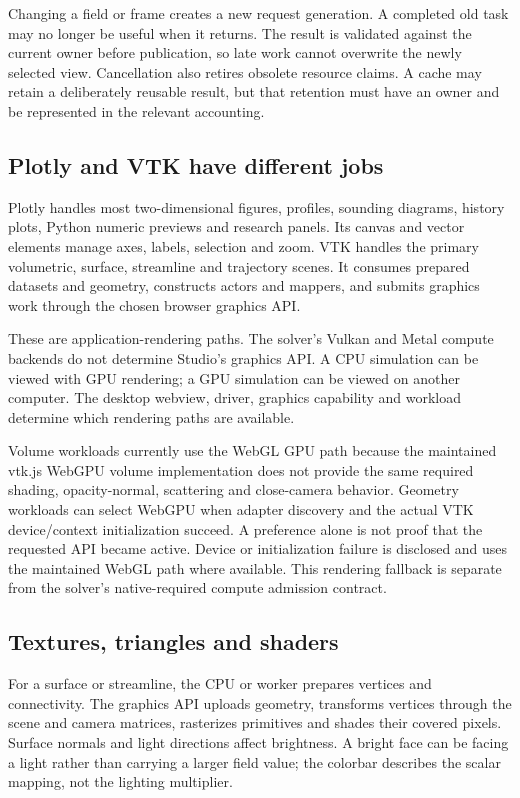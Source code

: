 Changing a field or frame creates a new request generation. A completed old task
may no longer be useful when it returns. The result is validated against the
current owner before publication, so late work cannot overwrite the newly
selected view. Cancellation also retires obsolete resource claims. A cache may
retain a deliberately reusable result, but that retention must have an owner and
be represented in the relevant accounting.

\subsection{Plotly and VTK have different jobs}
Plotly handles most two-dimensional figures, profiles, sounding diagrams,
history plots, Python numeric previews and research panels. Its canvas and vector
elements manage axes, labels, selection and zoom. VTK handles the primary
volumetric, surface, streamline and trajectory scenes. It consumes prepared
datasets and geometry, constructs actors and mappers, and submits graphics work
through the chosen browser graphics API.

These are application-rendering paths. The solver's Vulkan and Metal compute
backends do not determine Studio's graphics API. A CPU simulation can be viewed
with GPU rendering; a GPU simulation can be viewed on another computer. The
desktop webview, driver, graphics capability and workload determine which
rendering paths are available.

Volume workloads currently use the WebGL GPU path because the maintained
vtk.js WebGPU volume implementation does not provide the same required shading,
opacity-normal, scattering and close-camera behavior. Geometry workloads can
select WebGPU when adapter discovery and the actual VTK device/context
initialization succeed. A preference alone is not proof that the requested API
became active. Device or initialization failure is disclosed and uses the
maintained WebGL path where available. This rendering fallback is separate from
the solver's native-required compute admission contract.

\subsection{Textures, triangles and shaders}
For a surface or streamline, the CPU or worker prepares vertices and connectivity.
The graphics API uploads geometry, transforms vertices through the scene and
camera matrices, rasterizes primitives and shades their covered pixels. Surface
normals and light directions affect brightness. A bright face can be facing a
light rather than carrying a larger field value; the colorbar describes the
scalar mapping, not the lighting multiplier.


